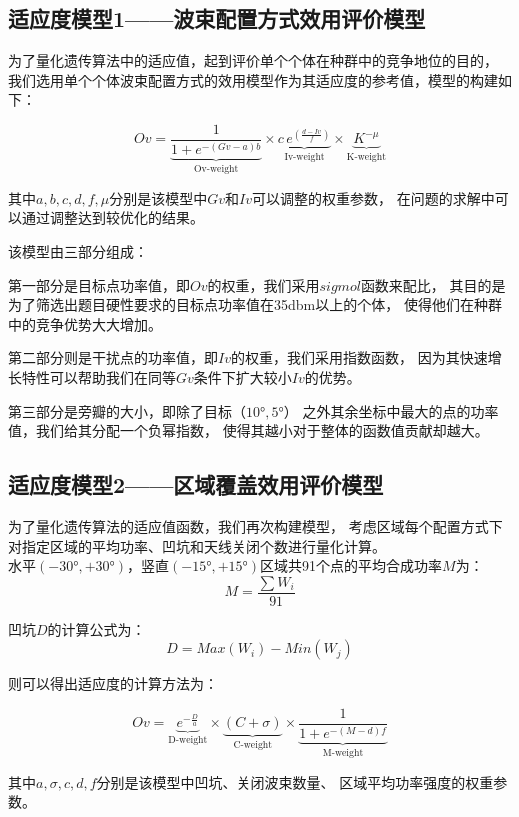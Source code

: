 \documentclass[UTF8,12pt]{ctexart}
\begin{document}
    \subsection[适应度模型1]{适应度模型1——波束配置方式效用评价模型}\label{SYDY}
        为了量化遗传算法中的适应值，起到评价单个个体在种群中的竞争地位的目的，
        我们选用单个个体波束配置方式的效用模型作为其适应度的参考值，模型的构建如下：
        \begin{Large}
            $$Ov = \underbrace{\frac{1}{1+e^{-(Gv-a)b}}}_{\text{Ov-weight}}×\underbrace{c\, e^{(\frac{d-Iv}{f})}}_{\text{Iv-weight}}×\underbrace{{K}^{-μ}}_{\text{K-weight}}$$
        \end{Large}
        其中$a,b,c,d,f,μ$分别是该模型中$Gv$和$Iv$可以调整的权重参数，
        在问题的求解中可以通过调整达到较优化的结果。\par

        \noindent 该模型由三部分组成：\par
        第一部分是目标点功率值，即$Ov$的权重，我们采用$sigmol$函数来配比，
        其目的是为了筛选出题目硬性要求的目标点功率值在35dbm以上的个体，
        使得他们在种群中的竞争优势大大增加。\par
        第二部分则是干扰点的功率值，即$Iv$的权重，我们采用指数函数，
        因为其快速增长特性可以帮助我们在同等$Gv$条件下扩大较小$Iv$的优势。\par
        第三部分是旁瓣的大小，即除了目标（$10°,5°$）
        之外其余坐标中最大的点的功率值，我们给其分配一个负幂指数，
        使得其越小对于整体的函数值贡献却越大。

\newpage
    \subsection[适应度模型2]{适应度模型2——区域覆盖效用评价模型}\label{SYDE}
        为了量化遗传算法的适应值函数，我们再次构建模型，
        考虑区域每个配置方式下对指定区域的平均功率、凹坑和天线关闭个数进行量化计算。\\
        水平$(-30°,+30°)$，竖直$(-15°,+15°)$区域共91个点的平均合成功率$M$为：
        $$M = \frac {\sum{W_i}} {91}$$
    
        \noindent 凹坑$D$的计算公式为：
        $$D = Max(W_i)-Min(W_j)$$
    
        \noindent 则可以得出适应度的计算方法为：
        \begin{Large}
            $$Ov = \underbrace{e^{-\frac {D}{a}}}_{\text{D-weight}}×\underbrace{(C+σ)}_{\text{C-weight}}× \underbrace{\frac {1}{1+e^{-(M-d)f}}}_{\text{M-weight}}$$
        \end{Large}
        其中$a,σ,c,d,f$分别是该模型中凹坑、关闭波束数量、
        区域平均功率强度的权重参数。\par
        
\end{document}
